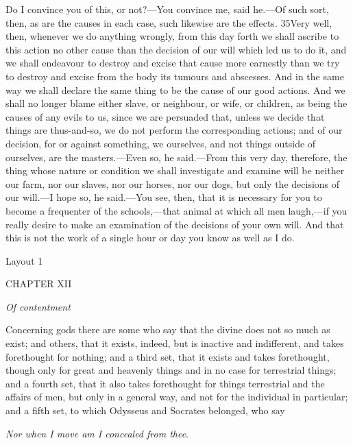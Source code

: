 Do I convince you of this, or not?—You convince me, said he.—Of such sort, then, as are the causes in each case, such likewise are the effects. 35Very well, then, whenever we do anything wrongly, from this day forth we shall ascribe to this action no other cause than the decision of our will which led us to do it, and we shall endeavour to destroy and excise that cause more earnestly than we try to destroy and excise from the body its tumours and abscesses. And in the same way we shall declare the same thing to be the cause of our good actions. And we shall no longer blame either slave, or neighbour, or wife, or children, as being the causes of any evils to us, since we are persuaded that, unless we decide that things are thus-and-so, we do not perform the corresponding actions; and of our decision, for or against something, we ourselves, and not things outside of ourselves, are the masters.—Even so, he said.—From this very day, therefore, the thing whose nature or condition we shall investigate and examine will be neither our farm, nor our slaves, nor our horses, nor our dogs, but only the decisions of our will.—I hope so, he said.—You see, then, that it is necessary for you to become a frequenter of the schools,—that animal at which all men laugh,—if you really desire to make an examination of the decisions of your own will. And that this is not the work of a single hour or day you know as well as I do.



Layout 1

CHAPTER XII

\emph{Of contentment}

Concerning gods there are some who say that the divine does not so much as exist; and others, that it exists, indeed, but is inactive and indifferent, and takes forethought for nothing; and a third set, that it exists and takes forethought, though only for great and heavenly things and in no case for terrestrial things; and a fourth set, that it also takes forethought for things terrestrial and the affairs of men, but only in a general way, and not for the individual in particular; and a fifth set, to which Odysseus and Socrates belonged, who say

\emph{Nor when I move am I concealed from thee}.

